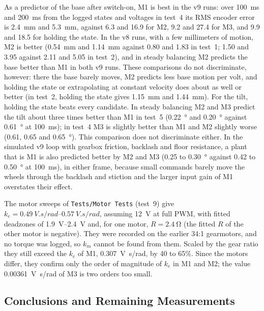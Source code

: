 As a predictor of the base after switch-on, M1 is best in the v9 runs: over
\SI{100}{ms} and \SI{200}{ms} from the logged states and voltages in test~4
its RMS encoder error is \SI{2.4}{mm} and \SI{5.3}{mm}, against 6.3 and 16.9
for M2, 9.2 and 27.4 for M3, and 9.9 and 18.5 for holding the state. In the v8
runs, with a few millimeters of motion, M2 is better (\SI{0.54}{mm} and
\SI{1.14}{mm} against 0.80 and 1.83 in test~1; 1.50 and 3.95 against 2.11 and
5.05 in test~2), and in steady balancing M2 predicts the base better than M1 in
both v9 runs. These comparisons do not discriminate, however: there the base
barely moves, M2 predicts less base motion per volt, and holding the state or
extrapolating at constant velocity does about as well or better (in test~2,
holding the state gives \SI{1.15}{mm} and \SI{1.44}{mm}). For the tilt,
holding the state beats every candidate. In steady balancing M2 and M3 predict
the tilt about three times better than M1 in test~5 (\SI{0.22}{\degree} and
\SI{0.20}{\degree} against \SI{0.61}{\degree} at \SI{100}{ms}); in test~4 M3
is slightly better than M1 and M2 slightly worse (0.61, 0.65 and
\SI{0.65}{\degree}). This comparison does not discriminate either. In the
simulated v9 loop with gearbox friction, backlash and floor resistance, a
plant that is M1 is also predicted better by M2 and M3 (0.25 to
\SI{0.30}{\degree} against 0.42 to \SI{0.50}{\degree} at \SI{100}{ms}), in
either frame, because small commands barely move the wheels through the
backlash and stiction and the larger input gain of M1 overstates their
effect.

The motor sweeps of \texttt{Tests/Motor Tests} (test~9) give
$k_e=\SIrange{0.49}{0.57}{V.s/rad}$, assuming \SI{12}{V} at full PWM, with
fitted deadzones of \SIrange{1.9}{2.4}{V} and, for one motor,
$R=\SI{2.4}{\ohm}$ (the fitted $R$ of the other motor is negative). They were
recorded on the earlier 34:1 gearmotors, and no torque was logged, so $k_m$
cannot be found from them. Scaled by the gear ratio they still exceed the
$k_e$ of M1, \SI{0.307}{V.s/rad}, by 40 to 65\%. Since the motors differ, they
confirm only the order of magnitude of $k_e$ in M1 and M2; the value
\SI{0.00361}{V.s/rad} of M3 is two orders too small.

\subsection{Conclusions and Remaining Measurements}
\label{sec:valresults}

